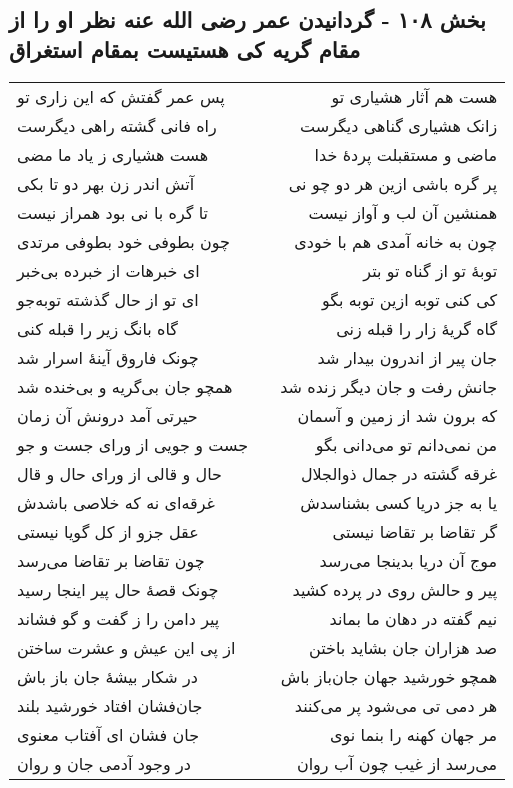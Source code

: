 \begin{center}
\section*{بخش ۱۰۸ - گردانیدن عمر رضی الله عنه نظر او را از مقام گریه کی هستیست بمقام استغراق}
\label{sec:sh108}
\begin{longtable}{l p{0.5cm} r}
پس عمر گفتش که این زاری تو
&&
هست هم آثار هشیاری تو
\\
راه فانی گشته راهی دیگرست
&&
زانک هشیاری گناهی دیگرست
\\
هست هشیاری ز یاد ما مضی
&&
ماضی و مستقبلت پردهٔ خدا
\\
آتش اندر زن بهر دو تا بکی
&&
پر گره باشی ازین هر دو چو نی
\\
تا گره با نی بود همراز نیست
&&
همنشین آن لب و آواز نیست
\\
چون بطوفی خود بطوفی مرتدی
&&
چون به خانه آمدی هم با خودی
\\
ای خبرهات از خبرده بی‌خبر
&&
توبهٔ تو از گناه تو بتر
\\
ای تو از حال گذشته توبه‌جو
&&
کی کنی توبه ازین توبه بگو
\\
گاه بانگ زیر را قبله کنی
&&
گاه گریهٔ زار را قبله زنی
\\
چونک فاروق آینهٔ اسرار شد
&&
جان پیر از اندرون بیدار شد
\\
همچو جان بی‌گریه و بی‌خنده شد
&&
جانش رفت و جان دیگر زنده شد
\\
حیرتی آمد درونش آن زمان
&&
که برون شد از زمین و آسمان
\\
جست و جویی از ورای جست و جو
&&
من نمی‌دانم تو می‌دانی بگو
\\
حال و قالی از ورای حال و قال
&&
غرقه گشته در جمال ذوالجلال
\\
غرقه‌ای نه که خلاصی باشدش
&&
یا به جز دریا کسی بشناسدش
\\
عقل جزو از کل گویا نیستی
&&
گر تقاضا بر تقاضا نیستی
\\
چون تقاضا بر تقاضا می‌رسد
&&
موج آن دریا بدینجا می‌رسد
\\
چونک قصهٔ حال پیر اینجا رسید
&&
پیر و حالش روی در پرده کشید
\\
پیر دامن را ز گفت و گو فشاند
&&
نیم گفته در دهان ما بماند
\\
از پی این عیش و عشرت ساختن
&&
صد هزاران جان بشاید باختن
\\
در شکار بیشهٔ جان باز باش
&&
همچو خورشید جهان جان‌باز باش
\\
جان‌فشان افتاد خورشید بلند
&&
هر دمی تی می‌شود پر می‌کنند
\\
جان فشان ای آفتاب معنوی
&&
مر جهان کهنه را بنما نوی
\\
در وجود آدمی جان و روان
&&
می‌رسد از غیب چون آب روان
\\
\end{longtable}
\end{center}
